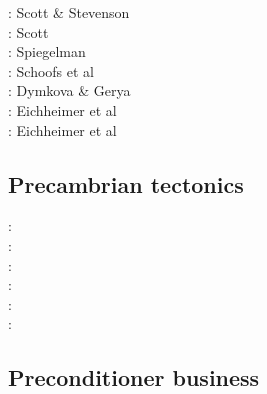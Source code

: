 \begin{scriptsize}
\nineteeneightysix: Scott \& Stevenson \cite{scst86}\\
\nineteeneightyeight: Scott \cite{scot88}\\
\nineteenninetythree: Spiegelman \cite{spie93}\\
\twothousand: Schoofs et al \cite{scth00b}\\
\twothousandthirteen: Dymkova \& Gerya \cite{dyge13}\\
\twothousandnineteen: Eichheimer et al \cite{eitp19}\\
\twothousandtwenty: Eichheimer et al \cite{eitf20}
\end{scriptsize}

\subsection{Precambrian tectonics}

\begin{scriptsize}
\nineteenninetyfour: \cite{guto94}\\
\twothousandthree: \cite{wemv03}\\
\twothousandten: \cite{sigb10}\\
\twothousandeleven: \cite{pege11}\\
\twothousandfourteen: \cite{gery14}\cite{gagb14}\cite{sigb14}\\
\twothousandtwenty: \cite{poyd20}
\end{scriptsize}

\subsection{Preconditioner business}

\begin{scriptsize}
\cite{benz02}
\cite{bewa08}
\cite{urvs08}
\end{scriptsize}

